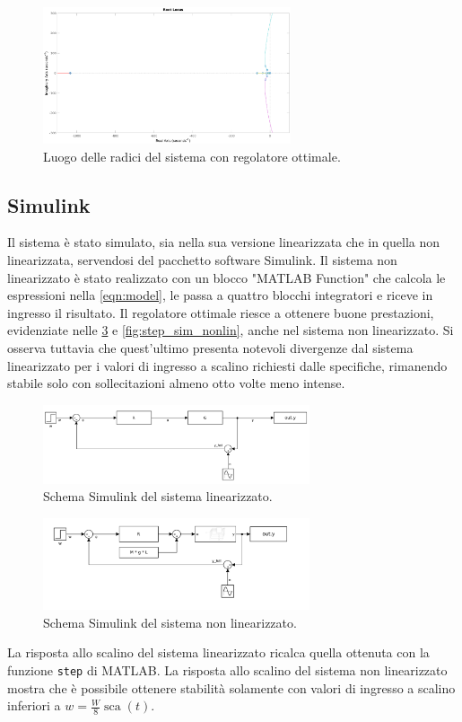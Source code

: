 \documentclass[a4paper]{article}
\DeclareMathOperator*{\sca}{\textrm{sca}}
\begin{document}
\begin{figure}[h!]
    \centering
    \includegraphics[width=0.65\textwidth]{rlocus}
    \caption{Luogo delle radici del sistema con regolatore ottimale.}
    \label{fig:rlocus}
\end{figure}

\subsection{Simulink}
Il sistema è stato simulato, sia nella sua versione linearizzata che in quella non linearizzata, servendosi del pacchetto software Simulink.
Il sistema non linearizzato è stato realizzato con un blocco "MATLAB Function" che calcola le espressioni nella \cref{eqn:model}, le passa a quattro blocchi integratori e riceve in ingresso il risultato.
Il regolatore ottimale riesce a ottenere buone prestazioni, evidenziate nelle \cref{fig:sim_nonlin} e \cref{fig:step_sim_nonlin}, anche nel sistema non linearizzato.
Si osserva tuttavia che quest'ultimo presenta notevoli divergenze dal sistema linearizzato per i valori di ingresso a scalino richiesti dalle specifiche, rimanendo stabile solo con sollecitazioni almeno otto volte meno intense.
\begin{figure}[h!]
    \centering
    \includegraphics[width=0.7\textwidth]{Simul1C.pdf}
    \caption{Schema Simulink del sistema linearizzato.}
    \label{fig:sim_lin}
\end{figure}
\begin{figure}[h!]
    \centering
    \includegraphics[width=0.7\textwidth]{NonLin1C.pdf}
    \caption{Schema Simulink del sistema non linearizzato. }
    \label{fig:sim_nonlin}
\end{figure}
La risposta allo scalino del sistema linearizzato ricalca quella ottenuta con la funzione \texttt{step} di MATLAB.
La risposta allo scalino del sistema non linearizzato mostra che è possibile ottenere stabilità solamente con valori di ingresso a scalino inferiori a $w = \frac{W}{8} \sca(t)$.
\end{document}
